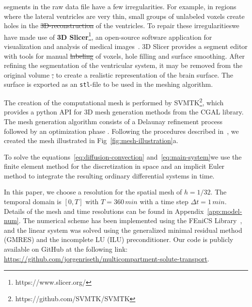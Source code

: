 \documentclass[a4paper,11pt]{article} %
\newcommand{\1}{^{(1)}}
\newcommand{\2}{^{(2)}}
\newcommand {\dt}   {\Delta t}
\providecommand{\DIFaddtex}[1]{{\protect\color{blue}\uwave{#1}}} %
\providecommand{\DIFdeltex}[1]{{\protect\color{red}\sout{#1}}}                      %
\providecommand{\DIFaddbegin}{} %
\providecommand{\DIFaddend}{} %
\providecommand{\DIFdelbegin}{} %
\providecommand{\DIFdelend}{} %
\providecommand{\DIFadd}[1]{\texorpdfstring{\DIFaddtex{#1}}{#1}} %
\providecommand{\DIFdel}[1]{\texorpdfstring{\DIFdeltex{#1}}{}} %
\newcommand{\DIFscaledelfig}{0.5}
\newlength{\DIFdelgraphicswidth} %
\newlength{\DIFdelgraphicsheight} %
\newcommand{\DIFaddincludegraphics}[2][]{{\color{blue}\fbox{\DIFOincludegraphics[#1]{#2}}}} %
\newcommand{\DIFdelincludegraphics}[2][]{%
\sbox{\DIFdelgraphicsbox}{\DIFOincludegraphics[#1]{#2}}%
\settoboxwidth{\DIFdelgraphicswidth}{\DIFdelgraphicsbox} %
\settoboxtotalheight{\DIFdelgraphicsheight}{\DIFdelgraphicsbox} %
\scalebox{\DIFscaledelfig}{%
\parbox[b]{\DIFdelgraphicswidth}{\usebox{\DIFdelgraphicsbox}\\[-\baselineskip] \rule{\DIFdelgraphicswidth}{0em}}\llap{\resizebox{\DIFdelgraphicswidth}{\DIFdelgraphicsheight}{%
\setlength{\unitlength}{\DIFdelgraphicswidth}%
\begin{picture}(1,1)%
\thicklines\linethickness{2pt} %
{\color[rgb]{1,0,0}\put(0,0){\framebox(1,1){}}}%
{\color[rgb]{1,0,0}\put(0,0){\line( 1,1){1}}}%
{\color[rgb]{1,0,0}\put(0,1){\line(1,-1){1}}}%
\end{picture}%
}\hspace*{3pt}}} %
} %
\DeclareRobustCommand{\DIFaddbegin}{\DIFOaddbegin \let\includegraphics\DIFaddincludegraphics} %
\DeclareRobustCommand{\DIFaddend}{\DIFOaddend \let\includegraphics\DIFOincludegraphics} %
\DeclareRobustCommand{\DIFdelbegin}{\DIFOdelbegin \let\includegraphics\DIFdelincludegraphics} %
\DeclareRobustCommand{\DIFdelend}{\DIFOaddend \let\includegraphics\DIFOincludegraphics} %
\begin{document}
\DIFadd{The various }\DIFaddend segments in the raw data file have a few irregularities. For example, in regions where the lateral ventricles are very thin, small groups of unlabeled voxels create holes in the \DIFdelbegin \DIFdel{3D-reconstruction }\DIFdelend \DIFaddbegin \DIFadd{3D reconstruction }\DIFaddend of the ventricles. To repair these irregularities\DIFaddbegin \DIFadd{, }\DIFaddend we have made use of \textbf{3D Slicer}\footnote{https://www.slicer.org/}, an open-source software application for visualization and analysis of medical images~\cite{fedorov2012}. 3D Slicer provides a segment editor with tools for manual \DIFdelbegin \DIFdel{labeling }\DIFdelend \DIFaddbegin \DIFadd{labelling }\DIFaddend of voxels, hole filling and surface smoothing. After refining the segmentation of the ventricular system, it may be removed from the original volume \DIFdelbegin \DIFdel{, }\DIFdelend to create a realistic representation of the brain surface. The surface is exported as an \texttt{stl}-file to be used in the meshing algorithm.  

The creation of the computational mesh is performed by SVMTK\footnote{https://github.com/SVMTK/SVMTK}, which provides a python API for 3D mesh generation methods from the CGAL library. The mesh generation algorithm consists of a Delaunay refinement process followed by an optimization phase \cite{cgal:rty-m3-22a}. Following the procedures described in~\cite{Mardal-2022-mri}, we created the mesh illustrated in Fig~\ref{fig:mesh-illustration}a.

To solve the equations~\eqref{eq:diffusion-convection} and~\eqref{eq:main-system}\DIFaddbegin \DIFadd{, }\DIFaddend we use the finite element method for the discretization in space and an implicit Euler method to integrate the resulting ordinary differential systems in time. 

In this paper, we choose a resolution for the spatial mesh of $h=1/32$. The temporal domain is $[0,T]$ with $T=360 \, \si{min}$ with a time step  \DIFaddbegin \DIFadd{of }\DIFaddend $\dt = 1 \, \si{min}$. Details of the mesh and time resolutions can be found in Appendix~\ref{app:model-num}. The numerical scheme has been implemented using the FEniCS Library~\cite{alnaes2015fenics,LoggMardalEtAl2012}, and the linear system was solved using the generalized minimal residual method (GMRES) and the incomplete LU (ILU) preconditioner. Our code is publicly available on GitHub at the following link: \url{https://github.com/jorgenriseth/multicompartment-solute-transport}.
\end{document}
